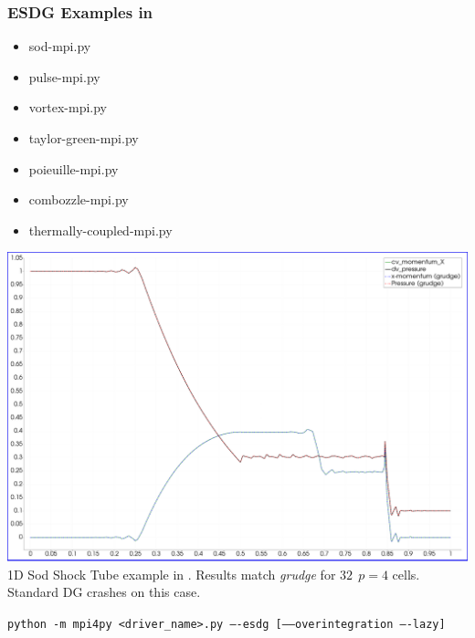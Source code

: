 \begin{frame}
  \frametitle{ESDG Examples in \mirgecom{}}
  \begin{minipage}[b]{0.48\textwidth}
        \begin{itemize}
        \item sod-mpi.py
        \item pulse-mpi.py
        \item vortex-mpi.py
        \item taylor-green-mpi.py
        \item poieuille-mpi.py
        \item combozzle-mpi.py
        \item thermally-coupled-mpi.py
        \end{itemize}
  \end{minipage}\hfill
  \begin{minipage}[b]{0.48\textwidth}
    \centering
    \includegraphics[width=\textwidth]{figures/compare-sod-shock-esdg-grudge.png}
    \vspace{5pt} %
    \footnotesize 1D Sod Shock Tube example in \mirgecom{}. Results match \textit{grudge} for $32~~p\!=\!4$ cells. Standard DG crashes on this case.
  \end{minipage}
\begin{center}
    \begin{tcolorbox}[colback=white,colframe=black,width=\textwidth,
                      boxrule=0.5pt,left=0pt,right=0pt,top=0pt,bottom=0pt]
      \footnotesize\texttt{python -m mpi4py <driver\_name>.py ----esdg [-----overintegration ----lazy]}
    \end{tcolorbox}
\end{center}  
\end{frame}

